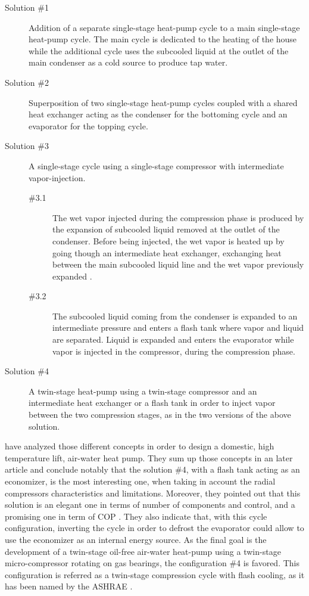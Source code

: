 \begin{description}
\item[Solution \#1] Addition of a separate single-stage heat-pump
  cycle to a main single-stage heat-pump cycle. The main cycle is
  dedicated to the heating of the house while the additional cycle
  uses the subcooled liquid at the outlet of the main condenser as a
  cold source to produce tap water.
\item[Solution \#2] Superposition of two single-stage heat-pump cycles
  coupled with a shared heat exchanger acting as the condenser for the
  bottoming cycle and an evaporator for the topping cycle.
\item[Solution \#3] A single-stage cycle using a single-stage
  compressor with intermediate vapor-injection.
  \begin{description}
  \item[\#3.1] The wet vapor injected during the compression phase is
    produced by the expansion of subcooled liquid removed at the
    outlet of the condenser. Before being injected, the wet vapor is
    heated up by going though an intermediate heat exchanger,
    exchanging heat between the main subcooled liquid line and the wet
    vapor previously expanded
    \cite{Zehnder-Favrat-2002a,Beeton-Pham-2003a}.
  \item[\#3.2] The subcooled liquid coming from the condenser is
    expanded to an intermediate pressure and enters a flash tank where
    vapor and liquid are separated. Liquid is expanded and enters the
    evaporator while vapor is injected in the compressor, during the
    compression phase.
  \end{description}
\item[Solution \#4] A twin-stage heat-pump using a twin-stage
  compressor and an intermediate heat exchanger or a flash tank in
  order to inject vapor between the two compression stages, as in the
  two versions of the above solution.
\end{description}

\citet{Schiffmann-Favrat-2005a} have analyzed those different concepts
in order to design a domestic, high temperature lift, air-water heat
pump. They sum up those concepts in an later article
\citep{Schiffmann-Favrat-2009a} and conclude notably that the solution
\#4, with a flash tank acting as an economizer, is the most
interesting one, when taking in account the radial compressors
characteristics and limitations. Moreover, they pointed out that this
solution is an elegant one in terms of number of components and
control, and a promising one in term of COP
\citep{schiffmann-2008a,Favrat-Courtin-1997a}. They also indicate
that, with this cycle configuration, inverting the cycle in order to
defrost the evaporator could allow to use the economizer as an
internal energy source. As the final goal is the development of a
twin-stage oil-free air-water heat-pump using a twin-stage
micro-compressor rotating on gas bearings, the configuration \#4 is
favored. This configuration is referred as a twin-stage compression
cycle with flash cooling, as it has been named by the ASHRAE
\citep[Fig.\,49, p.\,37.29]{ASHRAE-HVACeq-2008a-Compressor}.

